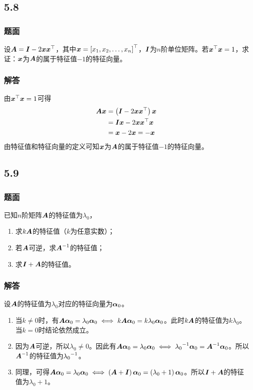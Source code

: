 \documentclass{beamer}
\begin{document}
\subsection*{5.8}
\begin{frame}
    \frametitle{题面}
    设\(\boldsymbol{A}=\boldsymbol{I}-2\boldsymbol{x}\boldsymbol{x}^\top\)，其中\(\boldsymbol{x}=\left[ {x}_1,{x}_2,\dots,{x}_{n} \right]^\top\)，\(\boldsymbol{I}\)为\(n\)阶单位矩阵。若\(\boldsymbol{x}^\top\boldsymbol{x}=1\)，求证：\(\boldsymbol{x}\)为\(\boldsymbol{A}\)的属于特征值\(-1\)的特征向量。
\end{frame}

\begin{frame}
    \frametitle{解答}
    由\(\boldsymbol{x}^\top\boldsymbol{x}=1\)可得
    \begin{align*}
        \boldsymbol{A}\boldsymbol{x} & =\left( \boldsymbol{I}-2\boldsymbol{x}\boldsymbol{x}^\top \right)\boldsymbol{x} \\
                   & =\boldsymbol{I}\boldsymbol{x}-2\boldsymbol{x}\boldsymbol{x}^\top\boldsymbol{x}   \\
                   & =\boldsymbol{x}-2\boldsymbol{x}=-\boldsymbol{x}
    \end{align*}
    \pause
    由特征值和特征向量的定义可知\(\boldsymbol{x}\)为\(\boldsymbol{A}\)的属于特征值\(-1\)的特征向量。
\end{frame}

\subsection*{5.9}
\begin{frame}
    \frametitle{题面}
    已知\(n\)阶矩阵\(\boldsymbol{A}\)的特征值为\(\lambda_0\)，
    \begin{enumerate}
        \item 求\(k\boldsymbol{A}\)的特征值（\(k\)为任意实数）；
        \item 若\(\boldsymbol{A}\)可逆，求\({\boldsymbol{A}}^{-1}\)的特征值；
        \item 求\(\boldsymbol{I}+\boldsymbol{A}\)的特征值。
    \end{enumerate}
\end{frame}

\begin{frame}
    \frametitle{解答}
    设\(\boldsymbol{A}\)的特征值为\(\lambda_0\)对应的特征向量为\(\boldsymbol{\alpha}_0\)。
    \begin{enumerate}
        \item 当\(k\neq0\)时，有\(\boldsymbol{A}\boldsymbol{\alpha}_0=\lambda_0\boldsymbol{\alpha}_0\iff k\boldsymbol{A}\boldsymbol{\alpha}_0=k\lambda_0\boldsymbol{\alpha}_0\)。此时\(k\boldsymbol{A}\)的特征值为\(k\lambda_0\)。当\(k=0\)时结论依然成立。\pause
        \item 因为\(\boldsymbol{A}\)可逆，所以\(\lambda_0\neq0\)。因此有\(\boldsymbol{A}\boldsymbol{\alpha}_0=\lambda_0\boldsymbol{\alpha}_0\iff{\lambda_0}^{-1}\boldsymbol{\alpha}_0={\boldsymbol{A}}^{-1}\boldsymbol{\alpha}_0\)。所以\({\boldsymbol{A}}^{-1}\)的特征值为\({\lambda_0}^{-1}\)。\pause
        \item 同理，可得\(\boldsymbol{A}\boldsymbol{\alpha}_0=\lambda_0\boldsymbol{\alpha}_0\iff\left( \boldsymbol{A}+\boldsymbol{I} \right)\boldsymbol{\alpha}_0=\left( \lambda_0+1 \right)\boldsymbol{\alpha}_0\)。所以\(\boldsymbol{I}+\boldsymbol{A}\)的特征值为\(\lambda_0+1\)。
    \end{enumerate}
\end{frame}
\end{document}
